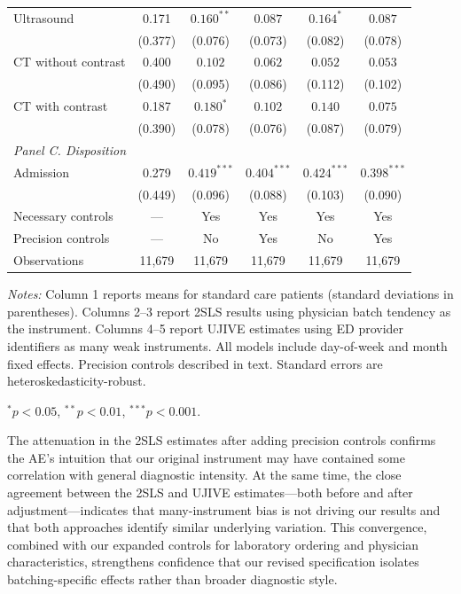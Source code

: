 \documentclass[11pt]{article}
\newcommand{\1}{\hbox{\rm 1\kern-.35em 1}}
\begin{document}
\begin{table}[t!]
\begin{threeparttable}
\begin{tabular}{lccccc}
Ultrasound 
& 0.171
& $0.160^{**}$ & $0.087$
& $0.164^{*}$ & $0.087$ \\
& (0.377)
& (0.076) & (0.073)
& (0.082) & (0.078) \\[0.5em]

CT without contrast 
& 0.400
& $0.102$ & $0.062$
& $0.052$ & $0.053$ \\
& (0.490)
& (0.095) & (0.086)
& (0.112) & (0.102) \\[0.5em]

CT with contrast 
& 0.187
& $0.180^{*}$ & $0.102$
& $0.140$ & $0.075$ \\
& (0.390)
& (0.078) & (0.076)
& (0.087) & (0.079) \\[0.5em]


\multicolumn{6}{l}{\textit{Panel C. Disposition}} \\[0.5em]

Admission 
& 0.279
& $0.419^{***}$ & $0.404^{***}$
& $0.424^{***}$ & $0.398^{***}$ \\
& (0.449)
& (0.096) & (0.088)
& (0.103) & (0.090) \\[0.5em]

\midrule
Necessary controls & --- & Yes & Yes & Yes & Yes \\
Precision controls & --- & No & Yes & No & Yes \\
Observations & 11,679 & 11,679 & 11,679 & 11,679 & 11,679 \\
\bottomrule
\end{tabular}

\begin{flushleft}
\footnotesize
\textit{Notes:} Column 1 reports means for standard care patients (standard deviations in parentheses). Columns 2–3 report 2SLS results using physician batch tendency as the instrument. Columns 4–5 report UJIVE estimates using ED provider identifiers as many weak instruments. All models include day-of-week and month fixed effects. Precision controls described in text. Standard errors are heteroskedasticity-robust.
\item $^{*} p < 0.05$, $^{**} p < 0.01$, $^{***} p < 0.001$.
\end{flushleft}

\end{threeparttable}
\end{table}

The attenuation in the 2SLS estimates after adding precision controls confirms the AE's intuition that our original instrument may have contained some correlation with general diagnostic intensity. At the same time, the close agreement between the 2SLS and UJIVE estimates---both before and after adjustment---indicates that many-instrument bias is not driving our results and that both approaches identify similar underlying variation. This convergence, combined with our expanded controls for laboratory ordering and physician characteristics, strengthens confidence that our revised specification isolates batching-specific effects rather than broader diagnostic style.
\end{document}
